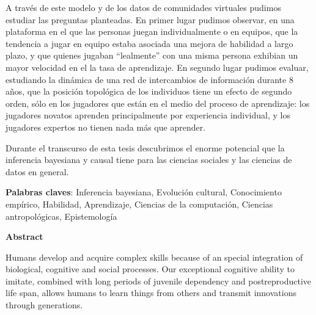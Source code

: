 \documentclass[a4paper,10pt]{book}
\theoremstyle{definition}
\begin{document}
A trav\'es de este modelo y de los datos de comunidades virtuales pudimos estudiar las preguntas planteadas.
%
%
En primer lugar pudimos observar, en una plataforma en el que las personas juegan individualmente o en equipos, que la tendencia a jugar en equipo estaba asociada una mejora de habilidad a largo plazo, y que quienes jugaban ``lealmente'' con una misma persona exhibian un mayor velocidad en el la tasa de aprendizaje.
%
%
En segundo lugar pudimos evaluar, estudiando la dinámica de una red de intercambios de información durante 8 años, que la posición topológica de los individuos tiene un efecto de segundo orden, sólo en los jugadores que están en el medio del proceso de aprendizaje: los jugadores novatos aprenden principalmente por experiencia individual, y los jugadores expertos no tienen nada más que aprender.


Durante el transcurso de esta tesis descubrimos el enorme potencial que la inferencia bayesiana y causal tiene para las ciencias sociales y las ciencias de datos en general.

\vspace{0.3cm}

\noindent \textbf{Palabras claves}: Inferencia bayesiana, Evoluci\'on cultural, Conocimiento emp\'irico, Habilidad, Aprendizaje, Ciencias de la computaci\'on, Ciencias antropol\'ogicas, Epistemolog\'ia


\newpage

\begin{center}
\textbf{Abstract}
\end{center}



Humans develop and acquire complex skills because of an special integration of biological, cognitive and social processes.
%
Our exceptional cognitive ability to imitate, combined with long periods of juvenile dependency and postreproductive life span, allows humans to learn things from others and transmit innovations through generations.
\end{document}
